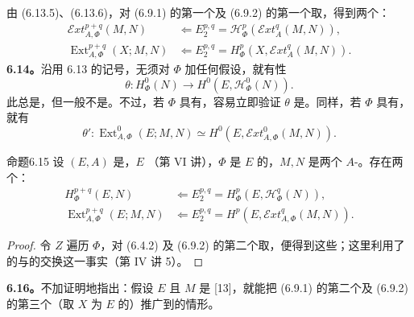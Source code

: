 由 (6.13.5)、(6.13.6)，对 (6.9.1) 的第一个及 (6.9.2) 的第一个取，得到两个：
\begin{align}\mathscr Ext_{A,\Phi}^{p+q}(M,N)&\Longleftarrow E_2^{p,q}=\mathscr H_\Phi^p(\mathscr Ext_A^q(M,N)),\tag{6.13.9}\\
\operatorname{Ext}_{A,\Phi}^{p+q}(X;M,N)&\Longleftarrow E_2^{p,q}=H_\Phi^p(X,\mathscr Ext_A^q(M,N)).\tag{6.13.10}\end{align}
\textbf{6.14。}沿用 6.13 的记号，无须对 $\Phi$ 加任何假设，就有性
\begin{equation}\theta:H_\Phi^0(N)\longrightarrow H^0(E,\mathscr H_\Phi^0(N)).\tag{6.14.1}\end{equation}
此总是，但一般不是。不过，若 $\Phi$ 具有，容易立即验证 $\theta$ 是。同样，若 $\Phi$ 具有，就有
\begin{equation}\theta':\operatorname{Ext}_{A,\Phi}^0(E;M,N)\simeq H^0(E,\mathscr Ext_{A,\Phi}^0(M,N)).\tag{6.14.2}\end{equation}
\begin{SGAresult}{命题}{6.15}
设 $(E,A)$ 是，$E$ （第 VI 讲），$\Phi$ 是 $E$ 的，$M,N$ 是两个 $A$-。存在两个：
\begin{align}H_\Phi^{p+q}(E,N)&\Longleftarrow E_2^{p,q}=H_\Phi^p(E,\mathscr H_\Phi^q(N)),\tag{6.15.1}\\
\operatorname{Ext}_{A,\Phi}^{p+q}(E;M,N)&\Longleftarrow E_2^{p,q}=H^p(E,\mathscr Ext_{A,\Phi}^q(M,N)).\tag{6.15.2}\end{align}
\end{SGAresult}
\begin{proof}令 $Z$ 遍历 $\Phi$，对 (6.4.2) 及 (6.9.2) 的第二个取，便得到这些；这里利用了的与的交换这一事实（第 IV 讲 5）。\end{proof}
\textbf{6.16。}不加证明地指出：假设 $E$ 且 $M$ 是 [13]，就能把 (6.9.1) 的第二个及 (6.9.2) 的第三个（取 $X$ 为 $E$ 的）推广到的情形。


